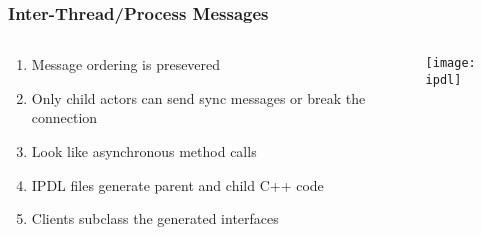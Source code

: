 \documentclass[
	notes=none,
	aspectratio=169
]{beamer}
\begin{document}
\begin{frame}
\frametitle{Inter-Thread/Process Messages}

\begin{columns}[T]
\begin{column}[T]{0.83\textwidth}
\setlength{\parskip}{0.5em}

\vspace{1.5cm}
\begin{enumerate}
\setlength{\parskip}{0.5em}
\item Message ordering is presevered
\item Only child actors can send sync messages or break the connection
\item Look like asynchronous method calls
\item IPDL files generate parent and child C++ code
\item Clients subclass the generated interfaces
\end{enumerate}

\end{column}
\begin{column}[T]{0.17\textwidth}
\setlength{\parskip}{0.5em}

\vspace{0.7cm}
\hspace{-0.5cm}
\texttt{[image: ipdl]}

\end{column}
\end{columns}

\end{frame}


\begin{frame}
\frametitle{}

\begin{columns}[T]
\begin{column}[T]{0.5\textwidth}
\setlength{\parskip}{0.5em}

\vspace{0.5cm}



\end{column}
\begin{column}[T]{0.5\textwidth}
\setlength{\parskip}{0.5em}

\vspace{0.5cm}





\end{column}
\end{columns}

\end{frame}
\note{
}
\end{document}
